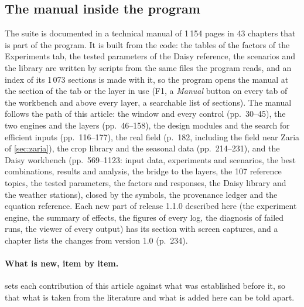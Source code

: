 \subsection{The manual inside the program}\label{sec:manual3}
The suite is documented in a technical manual of 1\,154 pages in 43 chapters \citep{HaliluManual} that is part of the program. It is built from the code: the tables of the factors of the Experiments tab, the tested parameters of the Daisy reference, the scenarios and the library are written by scripts from the same files the program reads, and an index of its 1\,073 sections is made with it, so the program opens the manual at the section of the tab or the layer in use (F1, a \emph{Manual} button on every tab of the workbench and above every layer, a searchable list of sections). The manual follows the path of this article: the window and every control (pp.~30--45), the two engines and the layers (pp.~46--158), the design modules and the search for efficient inputs (pp.~116--177), the real field (p.~182, including the field near Zaria of \cref{sec:zaria}), the crop library and the seasonal data (pp.~214--231), and the Daisy workbench (pp.~569--1123: input data, experiments and scenarios, the best combinations, results and analysis, the bridge to the layers, the 107 reference topics, the tested parameters, the factors and responses, the Daisy library and the weather stations), closed by the symbols, the provenance ledger and the equation reference. Each new part of release 1.1.0 described here (the experiment engine, the summary of effects, the figures of every log, the diagnosis of failed runs, the viewer of every output) has its section with screen captures, and a chapter lists the changes from version 1.0 (p.~234).

\paragraph{What is new, item by item.}  sets each contribution of this article against what was established before it, so that what is taken from the literature and what is added here can be told apart.


